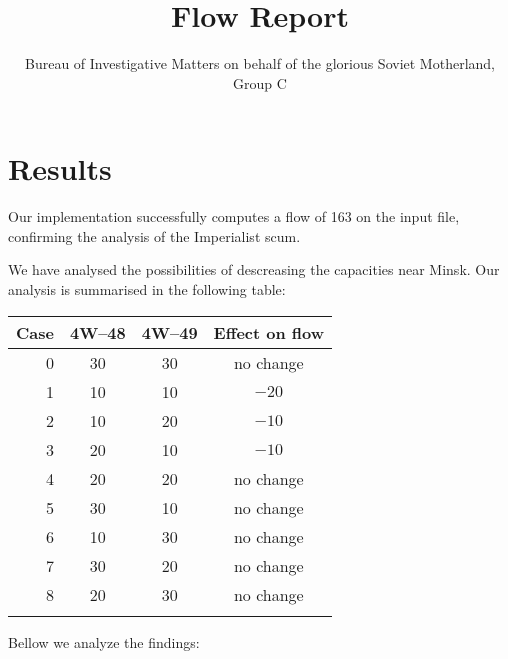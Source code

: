 \documentclass{tufte-handout}
\title{Flow Report}
\author{Bureau of Investigative Matters on behalf of the glorious Soviet Motherland, Group C}
\begin{document}
  \maketitle

  \section{Results}

  Our implementation successfully computes a flow of 163 on the input file, confirming the analysis of the Imperialist scum.

  We have analysed the possibilities of descreasing the capacities near Minsk.
  Our analysis is summarised in the following table:

\bigskip
  \begin{tabular}{rccc}\toprule
    Case & 4W--48 & 4W--49 & Effect on flow \\\midrule
    0& 30 & 30 & no change \\
    1& 10 & 10 & $-20$ \\
    2& 10 & 20 & $-10$ \\
    3& 20 & 10 & $-10$ \\
    4& 20 & 20 & no change \\
    5& 30 & 10 & no change \\
    6& 10 & 30 & no change \\
    7& 30 & 20 & no change \\
    8& 20 & 30 & no change \\
 \\\bottomrule
  \end{tabular}
\bigskip

 Bellow we analyze the findings:
\end{document}
